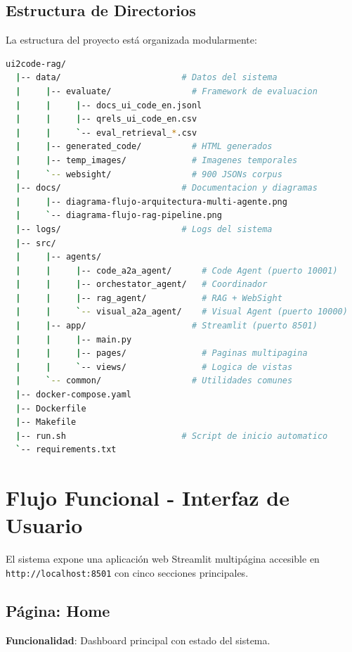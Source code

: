 \documentclass[12pt,a4paper]{article}
\begin{document}
\subsection{Estructura de Directorios}

La estructura del proyecto está organizada modularmente:

\begin{lstlisting}[language=bash,caption={Estructura de Directorios Principal}]
ui2code-rag/
  |-- data/                        # Datos del sistema
  |     |-- evaluate/                # Framework de evaluacion
  |     |     |-- docs_ui_code_en.jsonl
  |     |     |-- qrels_ui_code_en.csv
  |     |     `-- eval_retrieval_*.csv
  |     |-- generated_code/          # HTML generados
  |     |-- temp_images/             # Imagenes temporales
  |     `-- websight/                # 900 JSONs corpus
  |-- docs/                        # Documentacion y diagramas
  |     |-- diagrama-flujo-arquitectura-multi-agente.png
  |     `-- diagrama-flujo-rag-pipeline.png
  |-- logs/                        # Logs del sistema
  |-- src/
  |     |-- agents/
  |     |     |-- code_a2a_agent/      # Code Agent (puerto 10001)
  |     |     |-- orchestator_agent/   # Coordinador
  |     |     |-- rag_agent/           # RAG + WebSight
  |     |     `-- visual_a2a_agent/    # Visual Agent (puerto 10000)
  |     |-- app/                     # Streamlit (puerto 8501)
  |     |     |-- main.py
  |     |     |-- pages/               # Paginas multipagina
  |     |     `-- views/               # Logica de vistas
  |     `-- common/                  # Utilidades comunes
  |-- docker-compose.yaml
  |-- Dockerfile
  |-- Makefile
  |-- run.sh                       # Script de inicio automatico
  `-- requirements.txt
\end{lstlisting}

\section{Flujo Funcional - Interfaz de Usuario}

El sistema expone una aplicación web Streamlit multipágina accesible en \texttt{http://localhost:8501} con cinco secciones principales.

\subsection{Página: Home}

\textbf{Funcionalidad}: Dashboard principal con estado del sistema.
\end{document}
